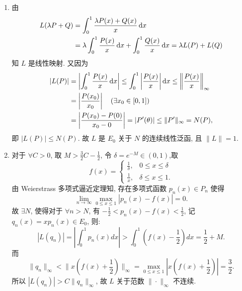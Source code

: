 \begin{enumerate}
\begin{answer}
\begin{enumerate}
        \item 由
        \begin{align*}
            L(\lambda P+Q)
            & =\int_0^1 \frac{\lambda P(x)+Q(x)}{x}\mathop{}\!\mathrm{d} x \\
            & =\lambda\int_0^1 \frac{P(x)}{x}\mathop{}\!\mathrm{d} x+\int_0^1 \frac{Q(x)}{x}\mathop{}\!\mathrm{d} x=\lambda L(P)+L(Q)
        \end{align*}
        知 $L$ 是线性映射. 又因为
        \begin{align*}
        |L(P)|
        &=\left|\int_0^1 \frac{P(x)}{x}\mathop{}\!\mathrm{d} x\right|\leq\int_0^1\left| \frac{P(x)}{x}\right|\mathop{}\!\mathrm{d} x\leq\left\| \frac{P(x)}{x}\right\|_{\infty}\\
        &=\left\lvert \frac{P(x_0)}{x_0}\right\rvert\quad(\exists x_0\in [0,1])\\
        &=\left\lvert \frac{P(x_0)-P(0)}{x_0-0}\right\rvert=|P'(\theta)|\leq\|P'\|_{\infty}=N(P),
        \end{align*}
        即 $|L(P)|\leq N(P)$.
        故 $L$ 是 $E_0$ 关于 $N$ 的连续线性泛函, 且 $\|L\|=1$.
        
        \item 对于 $\forall C>0$, 取 $M> \frac{3}{2}C- \frac{1}{2}$, 令 $\delta=e^{-M}\in (0,1)$,取
        \[f(x)=\begin{cases}
         \frac{1}{\delta}, & 0\leq x\leq\delta\\ 
         \frac{1}{x}, & \delta\leq x\leq 1.
        \end{cases}\]
        由 Weierstrass 多项式逼近定理知, 存在多项式函数 $p_n(x)\in P_n$ 使得
        \[\lim\limits_{n\to\infty}\max\limits_{0\leq x\leq 1}|p_n(x)-f(x)|=0.\]
        故 $\exists N$, 使得对于 $\forall n>N$, 
        有 $- \frac{1}{2}<p_n(x)-f(x)< \frac{1}{2}$, 记 $q_n(x)=xp_n(x)\in E_0$, 则:
        \[|L(q_n)|=\left\lvert\int_0^1p_n(x)dx\right\rvert>\int_0^1\left(f(x)- \frac{1}{2}\right)dx= \frac{1}{2}+M.\]
        而
        \[\|q_n\|_{\infty}<\|x(f(x)+ \frac{1}{2})\|_{\infty}=\max_{0\leq x\leq 1}\left\lvert x(f(x)+ \frac{1}{2})\right\rvert= \frac{3}{2}.\]
        所以 $|L(q_n)|>C\|q_n\|_{\infty}$, 故 $L$ 关于范数 $\|\cdot\|_{\infty}$ 不连续.
        

\end{enumerate}
\end{answer}
\end{enumerate}
